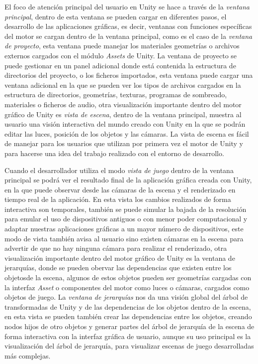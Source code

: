 \documentclass[a4paper]{book}
\begin{document}
El foco de atención principal del usuario en Unity se hace a través de la \textit{ventana principal},
dentro de esta ventana se pueden cargar en diferentes pasos, el desarrollo de las aplicaciones gráficas, es decir, ventanas con funciones
específicas del motor se cargan dentro de la ventana principal, como es el caso de la \textit{ventana de proyecto}, esta ventana puede manejar
los materiales geometrías o archivos externos cargados con el módulo \textit{Assets} de Unity. La ventana de
proyecto se puede gestionar en un panel adicional donde está contenida la estructura de directorios del proyecto, o los ficheros
importados, esta ventana puede cargar una ventana adicional en la que se pueden ver los tipos de archivos cargados en la
estructura de directorios, geometrías, texturas, programas de sombreado, materiales o ficheros de audio, otra visualización importante dentro
del motor gráfico de Unity es \textit{vista de escena}, dentro de la ventana principal, muestra al usuario una visión interactiva del mundo creado
con Unity en la que se podrán editar las luces, posición de los objetos y las cámaras. La vista de escena es fácil de manejar para los usuarios
que utilizan por primera vez el motor de Unity y para hacerse una idea del trabajo realizado con el entorno de desarrollo.

Cuando el desarrollador  utiliza el modo \textit{vista de juego} dentro de la ventana principal se podrá ver el resultado final de la aplicación gráfica 
creada con Unity, en la que puede observar desde las cámaras de la escena y el renderizado en tiempo real de la aplicación. En esta vista los cambios
realizados de forma interactiva son temporales, también se puede simular la bajada de la resolución para emular el uso de dispositivos antiguos
o con menor poder computacional y adaptar nuestras aplicaciones gráficas a un mayor número de dispositivos, este modo de vista también avisa al usuario
sino existen cámaras en la escena para advertir de que no hay ninguna cámara para realizar el renderizado, otra visualización importante dentro del
motor gráfico de Unity es la ventana de jerarquías, donde se pueden obervar las dependencias que existen entre los objetosde la escena,
algunos de estos objetos pueden ser geometrías cargadas con la interfaz \textit{Asset} o componentes del motor como luces o cámaras, cargados como
objetos de juego. La \textit{ventana de jerarquías} nos da una visión global del árbol de transformadas de Unity y de
las dependencias de los objetos dentro de la escena, en esta vista se pueden también crear las dependencias entre
los objetos, creando nodos hijos de otro objetos y generar partes del árbol de jerarquía de la escena de forma interactiva con la interfaz gráfica
de usuario, aunque su uso principal es la visualización del árbol de jerarquía, para visualizar escenas de juego desarrolladas
más complejas. \cite{unity:_unity_book}
\end{document}
